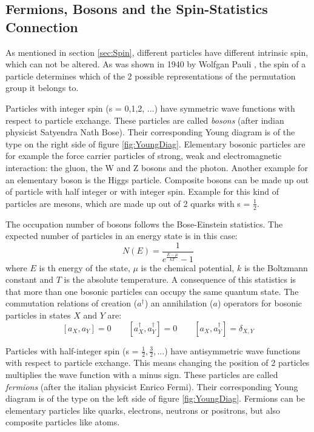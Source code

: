\subsection{Fermions, Bosons and the Spin-Statistics Connection}

As mentioned in section \ref{sec:Spin}, different particles have different intrinsic spin, which can not be altered. As was shown in 1940 by Wolfgan Pauli \cite{Pauli1940}, the spin of a particle determines which of the 2 possible representations of the permutation group it belongs to. 

Particles with integer spin (s = 0,1,2, ...) have symmetric wave functions with respect to particle exchange. These particles are called \textit{bosons} (after indian physicist Satyendra Nath Bose). Their corresponding Young diagram is of the type on the right side of figure \ref{fig:YoungDiag}. Elementary bosonic particles are for example the force carrier particles of strong, weak and electromagnetic interaction: the gluon, the W and Z bosons and the photon. Another example for an elementary boson is the Higgs particle. Composite bosons can be made up out of particle with half integer or with integer spin. Example for this kind of particles are mesons, which are made up out of 2 quarks with s = $\frac{1}{2}$. 

The occupation number of bosons follows the Bose-Einstein statistics. The expected number of particles in an energy state is in this case:
\begin{equation}
 N(E) = \frac{1}{e^{\frac{E-\mu}{kT}}-1}
\end{equation} 
where $E$ is th energy of the state, $\mu$ is the chemical potential, $k$ is the Boltzmann constant and $T$ is the absolute temperature. A consequence of this statistics is that more than one bosonic particles can occupy the same quantum state. The commutation relations of creation ($a^{\dag}$) an annihilation ($a$) operators for bosonic particles in states $X$ and $Y$ are:
\begin{equation}
\label{eq:bosComm}
 [a_{X},a_{Y}] = 0 \hspace{2em} [a^{\dag}_{X},a^{\dag}_{Y}] = 0 \hspace{2em} [a_{X},a^{\dag}_{Y}] = \delta_{X,Y}
\end{equation} 

Particles with half-integer spin (s = $\frac{1}{2},\frac{3}{2},...$) have antisymmetric wave functions with respect to particle exchange. This means changing the position of 2 particles multiplies the wave function with a minus sign. These particles are called \textit{fermions} (after the italian physicist Enrico Fermi). Their corresponding Young diagram is of the type on the left side of figure \ref{fig:YoungDiag}. Fermions can be elementary particles like quarks, electrons, neutrons or positrons, but also composite particles like atoms. 

